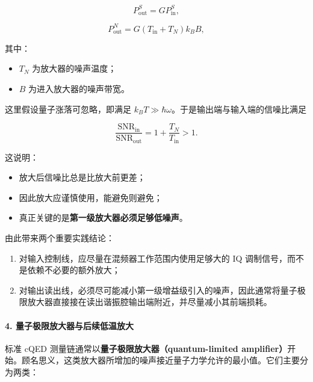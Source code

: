 \documentclass[12pt,a4paper,oneside]{ctexbook}
\begin{document}
\begin{equation}
    P_{\mathrm{out}}^S = G P_{\mathrm{in}}^S,
    \tag{46}
\end{equation}

\begin{equation}
    P_{\mathrm{out}}^N = G(T_{\mathrm{in}}+T_N)k_B B,
    \tag{47}
\end{equation}

其中：

\begin{itemize}
    \item $T_N$ 为放大器的噪声温度；
    \item $B$ 为进入放大器的噪声带宽。
\end{itemize}

这里假设量子涨落可忽略，即满足 $k_B T \gg \hbar\omega$。于是输出端与输入端的信噪比满足

\begin{equation}
    \frac{\mathrm{SNR}_{\mathrm{in}}}{\mathrm{SNR}_{\mathrm{out}}}
    =
    1+\frac{T_N}{T_{\mathrm{in}}}
    > 1.
    \tag{48}
\end{equation}

这说明：

\begin{itemize}
    \item 放大后信噪比总是比放大前更差；
    \item 因此放大应谨慎使用，能避免则避免；
    \item 真正关键的是\textbf{第一级放大器必须足够低噪声}。
\end{itemize}

由此带来两个重要实践结论：

\begin{enumerate}
    \item 对输入控制线，应尽量在混频器工作范围内使用足够大的 IQ 调制信号，而不是依赖不必要的额外放大；
    \item 对输出读出线，必须尽可能减小第一级增益级引入的噪声，因此通常将量子极限放大器直接接在读出谐振腔输出端附近，并尽量减小其前端损耗。
\end{enumerate}

\paragraph{4. 量子极限放大器与后续低温放大}

标准 cQED 测量链通常以\textbf{量子极限放大器（quantum-limited amplifier）}开始。顾名思义，这类放大器所增加的噪声接近量子力学允许的最小值。它们主要分为两类：
\end{document}
